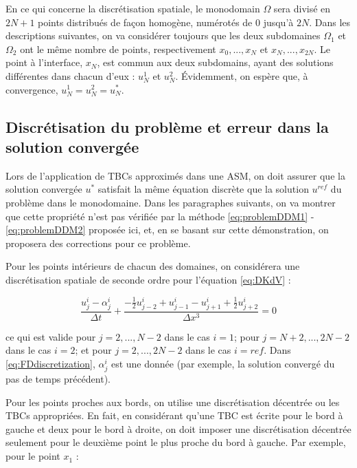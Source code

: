 \indent En ce qui concerne la discrétisation spatiale, le monodomain $\Omega$ sera divisé en $2N+1$ points distribués de façon homogène, numérotés de $0$ jusqu'à $2N$. Dans les descriptions suivantes, on va considérer toujours que les deux subdomaines $\Omega_1$ et $\Omega_2$ ont le même nombre de points, respectivement  $x_0,...,x_N$ et $x_N,...,x_{2N}$. Le point à l'interface, $x_N$, est commun aux deux subdomains, ayant des solutions différentes dans chacun d'eux : $u_N^1$ et $u_N^2$. Évidemment, on espère que, à convergence, $u_N^1 = u_N^2 = u_N^*$.


\subsection{Discrétisation du problème et erreur dans la solution convergée}

\indent Lors de l'application de TBCs approximés dans une ASM, on doit assurer que la solution convergée $u^*$ satisfait la même équation discrète que la solution $u^{ref}$ du problème dans le monodomaine. Dans les paragraphes suivants, on va montrer que cette propriété n'est pas vérifiée par la méthode  \eqref{eq:problemDDM1} - \eqref{eq:problemDDM2} proposée ici, et, en se basant sur cette démonstration, on proposera des corrections pour ce problème.

\indent Pour les points intérieurs de chacun des domaines, on considérera une discrétisation spatiale de seconde ordre pour l'équation \eqref{eq:DKdV} :

\begin{equation}
    \label{eq:FDdiscretization}
    \frac{u_j^i - \alpha_j^i}{\Delta t} + \frac{-\frac{1}{2}u_{j-2}^i + u_{j-1}^i - u_{j+1}^i + \frac{1}{2}u_{j+2}^i }{\Delta x ^3} = 0
\end{equation}

\noindent ce qui est valide pour $j=2,...,N-2$ dans le cas $i=1$; pour $j=N+2,...,2N-2$ dans le cas $i=2$; et pour $j=2,...,2N-2$ dans le cas $i=ref$. Dans \eqref{eq:FDdiscretization}, $\alpha_j^i$ est une donnée (par exemple, la solution convergé du pas de temps précédent).

\indent Pour les points proches aux bords, on utilise une discrétisation décentrée ou les TBCs appropriées. En fait, en considérant qu'une TBC est écrite pour le bord à gauche et deux pour le bord à droite, on doit imposer une discrétisation décentrée seulement pour le deuxième point le plus proche du bord à gauche. Par exemple, pour le point $x_1$ : 

